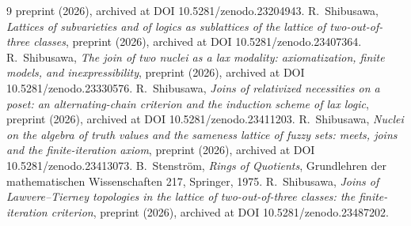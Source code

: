 \documentclass[11pt]{amsart}
\theoremstyle{definition}
\begin{document}
\begin{thebibliography}{9}
preprint (2026), archived at DOI 10.5281/zenodo.23204943.
 R.~Shibusawa, \emph{Lattices of subvarieties and of
logics as sublattices of the lattice of two-out-of-three classes}, preprint
(2026), archived at DOI 10.5281/zenodo.23407364.
 R.~Shibusawa, \emph{The join of two nuclei as a lax modality:
axiomatization, finite models, and inexpressibility}, preprint (2026),
archived at DOI 10.5281/zenodo.23330576.
 R.~Shibusawa, \emph{Joins of relativized necessities on a
poset: an alternating-chain criterion and the induction scheme of lax logic},
preprint (2026), archived at DOI 10.5281/zenodo.23411203.
 R.~Shibusawa, \emph{Nuclei on the algebra of truth values
and the sameness lattice of fuzzy sets: meets, joins and the
finite-iteration axiom}, preprint (2026), archived at DOI 10.5281/zenodo.23413073.
 B.~Stenstr\"om, \emph{Rings of Quotients}, Grundlehren
der mathematischen Wissenschaften 217, Springer, 1975.
 R.~Shibusawa, \emph{Joins of Lawvere--Tierney topologies
in the lattice of two-out-of-three classes: the finite-iteration criterion},
preprint (2026), archived at DOI 10.5281/zenodo.23487202.
\end{thebibliography}
\end{document}
